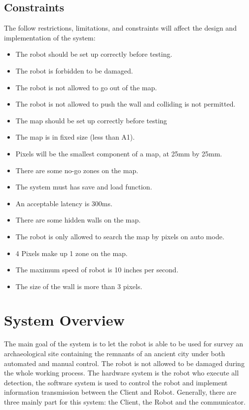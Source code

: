 \documentclass[11pt, a4paper]{report}
\begin{document}
\section{Constraints}
The follow restrictions, limitations, and constraints will affect the design and implementation of the system:
\begin{itemize}
  \item The robot should be set up correctly before testing.
  \item The robot is forbidden to be damaged.
  \item The robot is not allowed to go out of the map.
  \item The robot is not allowed to push the wall and colliding is not permitted.
  \item The map should be set up correctly before testing
  \item The map is in fixed size (less than A1).
  \item Pixels will be the smallest component of a map, at 25mm by 25mm.
  \item There are some no-go zones on the map.
  \item The system must has save and load function.
  \item An acceptable latency is 300ms.
  \item There are some hidden walls on the map.
  \item The robot is only allowed to  search the map by pixels on auto mode.
  \item 4 Pixels make up 1 zone on the map.
  \item The maximum speed of robot is 10 inches per second.
  \item The size of the wall is more than 3 pixels.
\end{itemize}


\pagebreak


\chapter{System Overview}%
The main goal of the system is to let the robot is able to be used for survey an archaeological site containing the remnants of an ancient city under both automated and manual control.  The robot is not allowed to be damaged during the whole working process. The hardware system is the robot who execute all detection, the software system is used to control the robot and implement information transmission between the Client and Robot. Generally, there are three mainly part for this system: the Client, the Robot and the communicator.  
\end{document}
